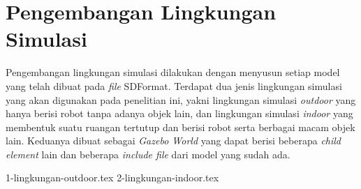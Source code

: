 \section{Pengembangan Lingkungan Simulasi}
\label{sec:lingkungansimulasi}

Pengembangan lingkungan simulasi dilakukan dengan menyusun setiap model yang telah dibuat pada \emph{file} SDFormat.
Terdapat dua jenis lingkungan simulasi yang akan digunakan pada penelitian ini,
  yakni lingkungan simulasi \emph{outdoor} yang hanya berisi robot tanpa adanya objek lain,
  dan lingkungan simulasi \emph{indoor} yang membentuk suatu ruangan tertutup dan berisi robot serta berbagai macam objek lain.
Keduanya dibuat sebagai \emph{Gazebo World} yang dapat berisi beberapa \emph{child element} lain dan beberapa \emph{include file} dari model yang sudah ada.

{1-lingkungan-outdoor.tex}
{2-lingkungan-indoor.tex}
